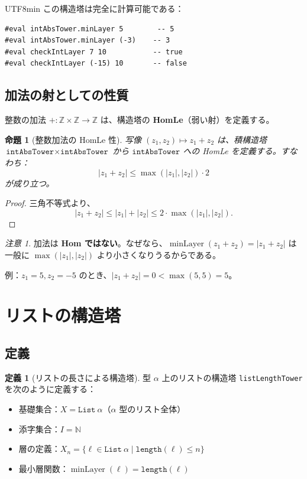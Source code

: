 \documentclass[12pt,a4paper]{article}
\newtheorem{proposition}[theorem]{命題}
\theoremstyle{definition}
\newtheorem{definition}[theorem]{定義}
\theoremstyle{remark}
\newtheorem{remark}[theorem]{注意}
\newcommand{\N}{\mathbb{N}}
\newcommand{\Z}{\mathbb{Z}}
\DeclareMathOperator{\minLayer}{minLayer}
\begin{document}
\begin{CJK}{UTF8}{min}
この構造塔は完全に計算可能である：

\begin{tcolorbox}[title=Lean での実装例]
\begin{verbatim}
#eval intAbsTower.minLayer 5        -- 5
#eval intAbsTower.minLayer (-3)    -- 3
#eval checkIntLayer 7 10           -- true
#eval checkIntLayer (-15) 10       -- false
\end{verbatim}
\end{tcolorbox}

\subsection{加法の射としての性質}

整数の加法 $+: \Z \times \Z \to \Z$ は、構造塔の \textbf{HomLe}（弱い射）を定義する。

\begin{proposition}[整数加法の HomLe 性]
写像 $(z_1, z_2) \mapsto z_1 + z_2$ は、積構造塔 $\texttt{intAbsTower} \times \texttt{intAbsTower}$ から $\texttt{intAbsTower}$ への HomLe を定義する。すなわち：
$$|z_1 + z_2| \leq \max(|z_1|, |z_2|) \cdot 2$$
が成り立つ。
\end{proposition}

\begin{proof}
三角不等式より、
$$|z_1 + z_2| \leq |z_1| + |z_2| \leq 2 \cdot \max(|z_1|, |z_2|).$$
\end{proof}

\begin{remark}
加法は \textbf{Hom ではない}。なぜなら、$\minLayer(z_1 + z_2) = |z_1 + z_2|$ は一般に $\max(|z_1|, |z_2|)$ より小さくなりうるからである。

例：$z_1 = 5, z_2 = -5$ のとき、$|z_1 + z_2| = 0 < \max(5, 5) = 5$。
\end{remark}

\section{リストの構造塔}

\subsection{定義}

\begin{definition}[リストの長さによる構造塔]
型 $\alpha$ 上のリストの構造塔 \texttt{listLengthTower} を次のように定義する：
\begin{itemize}
\item 基礎集合：$X = \texttt{List}\ \alpha$（$\alpha$ 型のリスト全体）
\item 添字集合：$I = \N$
\item 層の定義：$X_n = \{\ell \in \texttt{List}\ \alpha \mid \texttt{length}(\ell) \leq n\}$
\item 最小層関数：$\minLayer(\ell) = \texttt{length}(\ell)$
\end{itemize}
\end{definition}


\end{CJK}
\end{document}
